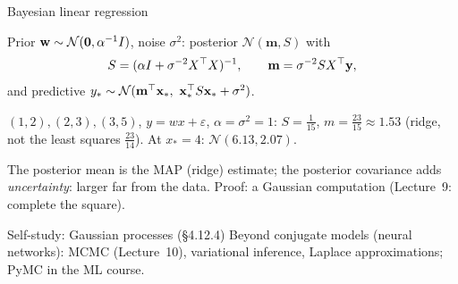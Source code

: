 \documentclass[aspectratio=1610,11pt]{beamer}
\begin{document}
\begin{frame}{Bayesian linear regression}
    \begin{theorem}
        \small Prior $\mathbf{w} \sim \mathcal{N}(\mathbf{0}, \alpha^{-1}I)$, noise $\sigma^2$: posterior $\mathcal{N}(\mathbf{m}, S)$ with
        \[S = (\alpha I + \sigma^{-2}X^\top X)^{-1}, \qquad \mathbf{m} = \sigma^{-2}SX^\top\mathbf{y},\]
        and predictive $y_* \sim \mathcal{N}(\mathbf{m}^\top\mathbf{x}_*, \ \mathbf{x}_*^\top S\mathbf{x}_* + \sigma^2)$.
    \end{theorem}
    \begin{example}[][ex:blr]
        \small $(1, 2), (2, 3), (3, 5)$, $y = wx + \varepsilon$, $\alpha = \sigma^2 = 1$: $S = \frac{1}{15}$, $m = \frac{23}{15} \approx 1.53$ (ridge, not the least squares $\frac{23}{14}$). At $x_* = 4$: $\mathcal{N}(6.13, 2.07)$.
    \end{example}
    \small
    The posterior mean is the MAP (ridge) estimate; the posterior covariance adds \emph{uncertainty}: larger far from the data. Proof: a Gaussian computation (Lecture~9: complete the square).
\end{frame}

\begin{frame}{Self-study: Gaussian processes (\S4.12.4)}
    \small \textcolor{mlcolor}{Beyond conjugate models (neural networks): MCMC (Lecture~10), variational inference, Laplace approximations; PyMC in the ML course.}
\end{frame}

\end{document}
